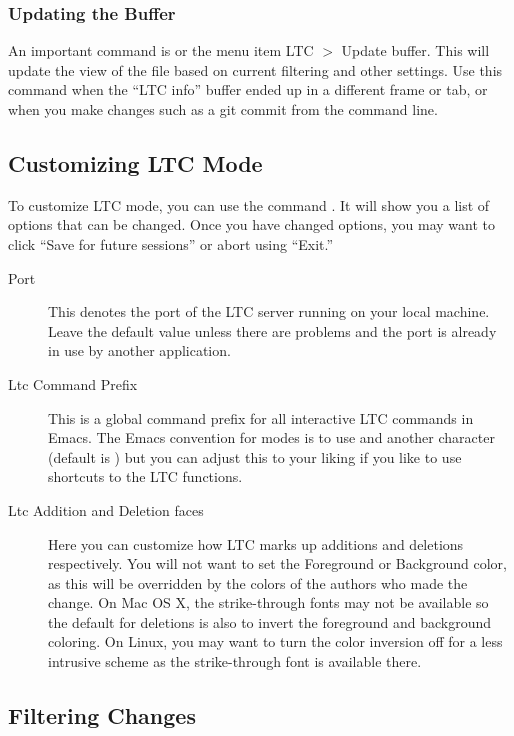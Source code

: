 \subsubsection{Updating the Buffer}

An important command is  or the menu item LTC $>$ Update buffer.  This will update the  view of the file based on current filtering and other settings.  Use this command when the ``LTC info'' buffer ended up in a different frame or tab, or when you make changes such as a git commit from the command line.

\subsection{Customizing LTC Mode}

To customize LTC mode, you can use the command .  It will show you a list of options that can be changed.  Once you have changed options, you may want to click ``Save for future sessions'' or abort using ``Exit.''

\begin{description}
\item[Port] This denotes the port of the LTC server running on your local machine.  Leave the default value unless there are problems and the port is already in use by another application.
\item[Ltc Command Prefix] This is a global command prefix for all interactive LTC commands in Emacs.  The Emacs convention for modes is to use  and another character (default is ) but you can adjust this to your liking if you like to use shortcuts to the LTC functions.
\item[Ltc Addition and Deletion faces]  Here you can customize how LTC marks up additions and deletions respectively.  You will not want to set the Foreground or Background color, as this will be overridden by the colors of the authors who made the change.  On Mac OS X, the strike-through fonts may not be available so the default for deletions is also to invert the foreground and background coloring.  On Linux, you may want to turn the color inversion off for a less intrusive scheme as the strike-through font is available there.
\end{description}

\subsection{Filtering Changes}

